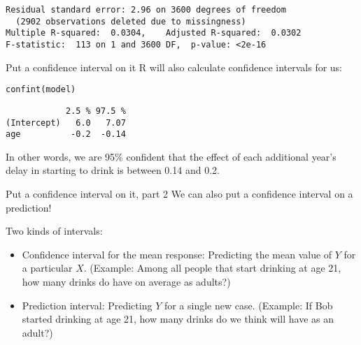 \documentclass{beamer}\usepackage[]{graphicx}\usepackage[]{color}
\makeatletter
\newcommand{\hlstd}[1]{\textcolor[rgb]{1,0.894,0.769}{#1}}%
\newcommand{\hlkwd}[1]{\textcolor[rgb]{1,0.78,0.769}{#1}}%
\newenvironment{kframe}{%
 \def\at@end@of@kframe{}%
 \ifinner\ifhmode%
  \def\at@end@of@kframe{\end{minipage}}%
  \begin{minipage}{\columnwidth}%
 \fi\fi%
 \def\FrameCommand##1{\hskip\@totalleftmargin \hskip-\fboxsep
 \colorbox{shadecolor}{##1}\hskip-\fboxsep
     \hskip-\linewidth \hskip-\@totalleftmargin \hskip\columnwidth}%
 \MakeFramed {\advance\hsize-\width
   \@totalleftmargin\z@ \linewidth\hsize
   \@setminipage}}%
 {\par\unskip\endMakeFramed%
 \at@end@of@kframe}
\newenvironment{knitrout}{}{} %
\makeatother
\begin{document}
\begin{darkframes}
\begin{frame}[fragile]
\begin{knitrout}
\begin{kframe}
\begin{verbatim}
Residual standard error: 2.96 on 3600 degrees of freedom
  (2902 observations deleted due to missingness)
Multiple R-squared:  0.0304,	Adjusted R-squared:  0.0302 
F-statistic:  113 on 1 and 3600 DF,  p-value: <2e-16
\end{verbatim}
\end{kframe}
\end{knitrout}

    \end{frame}

    \begin{frame}[fragile]{Put a confidence interval on it}
      R will also calculate confidence intervals for us:
\begin{knitrout}
\color{fgcolor}\begin{kframe}
\begin{alltt}
\hlkwd{confint}\hlstd{(model)}
\end{alltt}
\begin{verbatim}
            2.5 % 97.5 %
(Intercept)   6.0   7.07
age          -0.2  -0.14
\end{verbatim}
\end{kframe}
\end{knitrout}

      \pause
      In other words, we are 95\% confident that the effect of each additional year's delay in starting to drink is between 0.14 and 0.2.
    \end{frame}

    \begin{frame}{Put a confidence interval on it, part 2}
      We can also put a confidence interval on a prediction!

      Two kinds of intervals:

      \begin{itemize}
        \item \alert{Confidence interval for the mean response}: Predicting the mean value of $Y$ for a particular $X$. (Example: Among all people that start drinking at age 21, how many drinks do have on average as adults?) 
        \item \alert{Prediction interval}: Predicting $Y$ for a single new case. (Example: If Bob started drinking at age 21, how many drinks do we think will have as an adult?) 
      \end{itemize}
    \end{frame}


\end{darkframes}
\end{document}
